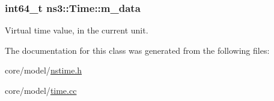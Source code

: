 \subsubsection[{\texorpdfstring{m\+\_\+data}{m_data}}]{\setlength{\rightskip}{0pt plus 5cm}int64\+\_\+t ns3\+::\+Time\+::m\+\_\+data\hspace{0.3cm}{\ttfamily [private]}}\hypertarget{classns3_1_1Time_aa189a3efe01c8a8dc78d94ca85763ea9}{}\label{classns3_1_1Time_aa189a3efe01c8a8dc78d94ca85763ea9}


Virtual time value, in the current unit. 



The documentation for this class was generated from the following files\+:\begin{DoxyCompactItemize}
\item 
core/model/\hyperlink{nstime_8h}{nstime.\+h}\item 
core/model/\hyperlink{time_8cc}{time.\+cc}\end{DoxyCompactItemize}
